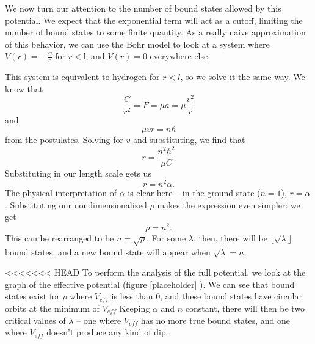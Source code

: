 \documentclass[12pt,twoside]{reedthesis}
\newcommand{\eqn}[1]{\begin{equation}#1\end{equation}}
\begin{document}
We now turn our attention to the number of bound states allowed by this potential. We expect that the exponential term will act as a cutoff, limiting the number of bound states to some finite quantity. As a really naive approximation of this behavior, we can use the Bohr model to look at a system where $V(r) = -\frac{C}{r}$ for $r < $l, and $V(r) = 0$ everywhere else.

This system is equivalent to hydrogen for $r<l$, so we solve it the same way. We know that
\eqn{
\frac{C}{r^2} = F = \mu a = \mu \frac{v^2}{r}
}
and 
\eqn{
\mu v r = n\hbar
}
from the postulates. Solving for $v$ and substituting, we find that
\eqn{
r = \frac{n^2 \hbar^2}{\mu C}
}
Substituting in our length scale gets us 
\eqn{
r = n^2 \alpha \mbox{.}
}
The physical interpretation of $\alpha$ is clear here -- in the ground state ($n = 1$), $r = \alpha$. Substituting our nondimensionalized $\rho$ makes the expression even simpler: we get
\eqn{
\rho = n^2\mbox{.}
}
This can be rearranged to be $n = \sqrt{\rho}$. For some $\lambda$, then, there will be $\lfloor \sqrt{\lambda} \rfloor$ bound states, and a new bound state will appear when $\sqrt{\lambda} = n$.

<<<<<<< HEAD
To perform the analysis of the full potential, we look at the graph of the effective potential (figure [placeholder]%
). 
We can see that bound states exist for $\rho$ where $V_{eff}$ is less than 0, and these bound states have circular orbits at the minimum of $V_{eff}$ Keeping $\alpha$ and $n$ constant, there will then be two critical values of $\lambda$ -- one where $V_{eff}$ has no more true bound states, and one where $V_{eff}$ doesn't produce any kind of dip.
\end{document}
